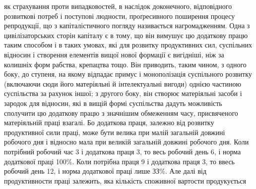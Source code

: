 як страхування проти випадковостей, в наслідок доконечного, відповідного розвиткові
потреб і поступові людности, проґресивного поширення процесу репродукції,
що з капіталістичного погляду називається нагромадженням. Одна з цивілізаторських
сторін капіталу є в тому, що він вимушує цю додаткову працю
таким способом і в таких умовах, які для розвитку продуктивних сил, суспільних
відносин і створення елементів вищої нової формації є вигідніші, ніж за колишніх
форм рабства, крепацтва тощо. Він приводить, таким чином, з одного боку, до
ступеня, на якому відпадає примус і монополізація суспільного розвитку (включаючи
сюди його матеріяльні й інтелектуальні вигоди) однією частиною суспільства
за рахунок іншої; з другого боку, він створює матеріяльні засоби
і зародок для відносин, які в вищій формі суспільства дадуть можливість сполучити
цю додаткову працю з значнішим обмеженням часу, присвяченого матеріяльній
праці взагалі. Бо додаткова праця, залежно від розвитку продуктивної
сили праці, може бути велика при малій загальній довжині робочого дня і відносно
мала при великій загальній довжині робочого дня. Коли потрібний робочий
час \deq{} 3 і додаткова праця \deq{} 3, то весь робочий день \deq{} 6, і норма додаткової
праці \deq{} 100\%. Коли потрібна праця \deq{} 9 і додаткова праця \deq{} 3, то ввесь
робочий день \deq{} 12, і норма додаткової праці \deq{} лише ЗЗ\%. Але далі від продуктивности
праці залежить, яка кількість споживної вартости продукується
\parbreak{}  %
